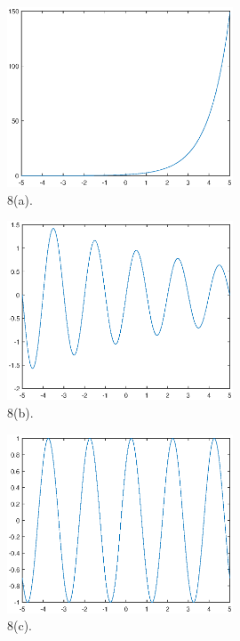 \documentclass[a4paper]{article}
\begin{document}
\begin{figure}[H]
  \begin{center}
    \includegraphics[width=0.6\textwidth]{8(a).eps}
  \end{center}
  \caption{8(a).}
\end{figure}
\begin{figure}[H]
  \begin{center}
    \includegraphics[width=0.6\textwidth]{8(b).eps}
  \end{center}
  \caption{8(b).}
\end{figure}
\begin{figure}[H]
  \begin{center}
    \includegraphics[width=0.6\textwidth]{8(c).eps}
  \end{center}
  \caption{8(c).}
\end{figure}
\end{document}
